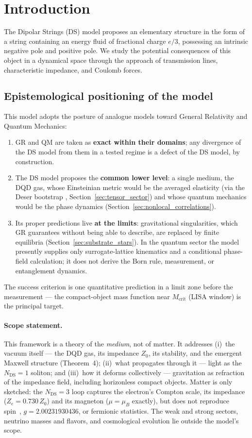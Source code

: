 \documentclass[11pt,a4paper]{article}
\theoremstyle{plain}
\theoremstyle{remark}
\newcommand{\Ncd}{\ensuremath{N_{\mathrm{DS}}}}
\begin{document}
\tableofcontents
\newpage

\section{Introduction}
The Dipolar Strings (DS) model proposes an elementary structure in the form of a string containing an energy fluid of fractional charge $e/3$, possessing an intrinsic negative pole and positive pole. We study the potential consequences of this object in a dynamical space through the approach of transmission lines, characteristic impedance, and Coulomb forces.

\subsection*{Epistemological positioning of the model}
This model adopts the posture of analogue models \cite{barcelo, volovik} toward General Relativity and Quantum Mechanics:
\begin{enumerate}[label=(\roman*)]
    \item GR and QM are taken as \textbf{exact within their domains}; any divergence of the DS model from them in a tested regime is a defect of the DS model, by construction.
    \item The DS model proposes the \textbf{common lower level}: a single medium, the DQD gas, whose Einsteinian metric would be the averaged elasticity (via the Deser bootstrap \cite{deser1970}, Section~\ref{sec:tensor_sector}) and whose quantum mechanics would be the phase dynamics (Section~\ref{sec:nonlocal_correlations}).
    \item Its proper predictions live \textbf{at the limits}: gravitational singularities, which GR guarantees without being able to describe, are replaced by finite equilibria (Section~\ref{sec:substrate_stars}). In the quantum sector the model presently supplies only surrogate-lattice kinematics and a conditional phase-field calculation; it does not derive the Born rule, measurement, or entanglement dynamics.
\end{enumerate}
The success criterion is one quantitative prediction in a limit zone before the measurement --- the compact-object mass function near $M_{\text{crit}}$ (LISA window) is the principal target.

\paragraph{Scope statement.} This framework is a theory of the \emph{medium}, not of matter. It addresses (i)~the vacuum itself --- the DQD gas, its impedance $Z_0$, its stability, and the emergent Maxwell structure (Theorem~4); (ii)~what propagates through it --- light as the $\Ncd=1$ soliton; and (iii)~how it deforms collectively --- gravitation as refraction of the impedance field, including horizonless compact objects. Matter is only sketched: the $\Ncd=3$ loop captures the electron's Compton scale, its impedance ($Z_e = 0.730\,Z_0$) and its magneton ($\mu = \mu_B$ exactly), but does not reproduce spin~\textonehalf, $g = 2.00231930436$, or fermionic statistics. The weak and strong sectors, neutrino masses and flavors, and cosmological evolution lie outside the model's scope.
\end{document}
